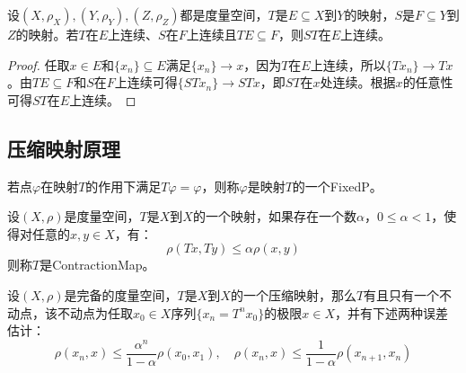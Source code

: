 \begin{theorem}\label{theo:CompositeContinuousMap}
	设$(X,\rho_X),(Y,\rho_Y),(Z,\rho_Z)$都是度量空间，$T$是$E\subseteq X$到$Y$的映射，$S$是$F\subseteq Y$到$Z$的映射。若$T$在$E$上连续、$S$在$F$上连续且$TE\subseteq F$，则$ST$在$E$上连续。
\end{theorem}
\begin{proof}
	任取$x\in E$和$\{x_n\}\subseteq E$满足$\{x_n\}\to x$，因为$T$在$E$上连续，所以$\{Tx_n\}\to Tx$。由$TE\subseteq F$和$S$在$F$上连续可得$\{STx_n\}\to STx$，即$ST$在$x$处连续。根据$x$的任意性可得$ST$在$E$上连续。
\end{proof}

\subsection{压缩映射原理}
\begin{definition}
	若点$\varphi$在映射$T$的作用下满足$T\varphi=\varphi$，则称$\varphi$是映射$T$的一个\gls{FixedP}。
\end{definition}
\begin{definition}
	设$(X,\rho)$是度量空间，$T$是$X$到$X$的一个映射，如果存在一个数$\alpha$，$0\leqslant\alpha<1$，使得对任意的$x,y\in X$，有：
	\begin{equation*}
		\rho(Tx,Ty)\leqslant\alpha\rho(x,y)
	\end{equation*}
	则称$T$是\gls{ContractionMap}。
\end{definition}
\begin{theorem}\label{theo:ContractionMapTheorem}
	设$(X,\rho)$是完备的度量空间，$T$是$X$到$X$的一个压缩映射，那么$T$有且只有一个不动点，该不动点为任取$x_0\in X$序列$\{x_n=T^nx_0\}$的极限$x\in X$，并有下述两种误差估计：
	\begin{equation*}
		\rho(x_n,x)\leqslant\frac{\alpha^n}{1-\alpha}\rho(x_0,x_1),\quad\rho(x_n,x)\leqslant\frac{1}{1-\alpha}\rho(x_{n+1},x_{n})
	\end{equation*}
\end{theorem}
